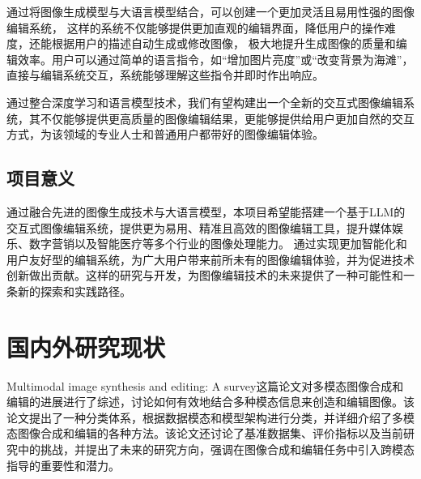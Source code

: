 \documentclass[a4paper,AutoFakeBold,oneside,12pt]{book}
\begin{document}
通过将图像生成模型与大语言模型结合，可以创建一个更加灵活且易用性强的图像编辑系统，
这样的系统不仅能够提供更加直观的编辑界面，降低用户的操作难度，还能根据用户的描述自动生成或修改图像，
极大地提升生成图像的质量和编辑效率。用户可以通过简单的语言指令，如“增加图片亮度”或“改变背景为海滩”，
直接与编辑系统交互，系统能够理解这些指令并即时作出响应。

通过整合深度学习和语言模型技术，我们有望构建出一个全新的交互式图像编辑系统，其不仅能够提供更高质量的图像编辑结果，更能够提供给用户更加自然的交互方式，为该领域的专业人士和普通用户都带好的图像编辑体验。
\subsection{项目意义}
通过融合先进的图像生成技术与大语言模型，本项目希望能搭建一个基于LLM的交互式图像编辑系统，提供更为易用、精准且高效的图像编辑工具，提升媒体娱乐、数字营销以及智能医疗等多个行业的图像处理能力。
通过实现更加智能化和用户友好型的编辑系统，为广大用户带来前所未有的图像编辑体验，并为促进技术创新做出贡献。这样的研究与开发，为图像编辑技术的未来提供了一种可能性和一条新的探索和实践路径。
\section{国内外研究现状}
Multimodal image synthesis and editing: A survey\cite{zhan2022multimodal}这篇论文对多模态图像合成和编辑的进展进行了综述，讨论如何有效地结合多种模态信息来创造和编辑图像。该论文提出了一种分类体系，根据数据模态和模型架构进行分类，并详细介绍了多模态图像合成和编辑的各种方法。该论文还讨论了基准数据集、评价指标以及当前研究中的挑战，并提出了未来的研究方向，强调在图像合成和编辑任务中引入跨模态指导的重要性和潜力。
\end{document}
